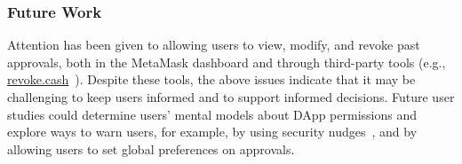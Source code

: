 \documentclass[conference]{IEEEtran}
\begin{document}

\subsubsection*{\textbf{Future Work}}
Attention has been given to allowing users to view, modify, and revoke past approvals, both in the MetaMask dashboard and through third-party tools (e.g., \url{revoke.cash}~\cite{revokeCash}). 
Despite these tools, the above issues indicate that it may be challenging to keep users informed and to support informed decisions. 
Future user studies could determine users' mental models about DApp permissions and explore ways to warn users, for example, by using security nudges~\cite{acquisti2017nudges}, and by allowing users to set global preferences on approvals.



\end{document}
